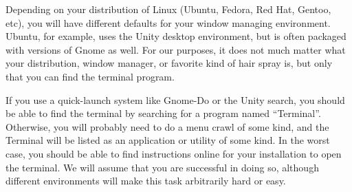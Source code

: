 Depending on your distribution of Linux (Ubuntu, Fedora, Red Hat, Gentoo, etc), you will have different defaults for your window managing environment.
Ubuntu, for example, uses the Unity desktop environment, but is often packaged with versions of Gnome as well.
For our purposes, it does not much matter what your distribution, window manager, or favorite kind of hair spray is, but only that you can find the terminal program.

If you use a quick-launch system like Gnome-Do or the Unity search, you should be able to find the terminal by searching for a program named ``Terminal''.
Otherwise, you will probably need to do a menu crawl of some kind, and the Terminal will be listed as an application or utility of some kind.
In the worst case, you should be able to find instructions online for your installation to open the terminal.
We will assume that you are successful in doing so, although different environments will make this task arbitrarily hard or easy.
